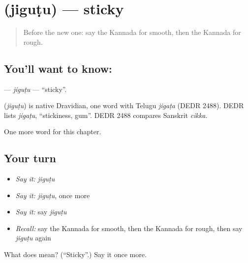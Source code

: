 \section[\texorpdfstring{\kn{ಜಿಗುಟು} (jiguṭu)}{ಜಿಗುಟು (jiguṭu)}]{ (jiguṭu) — sticky}

\label{lesson:KA-C219-jigutu}



\begin{quote}
Before the new one: say the Kannada for smooth, then the Kannada for rough.
\end{quote}

\subsection*{You'll want to know: }
\textbf{} — \emph{jiguṭu} — \textquotedblleft{}sticky\textquotedblright{}.

\begin{cousinweb}
\textbf{} (\emph{jiguṭu}) is native Dravidian, one word with Telugu \emph{jigaṭa} (DEDR 2488). DEDR lists \emph{jigaṭu}, \textquotedblleft{}stickiness, gum\textquotedblright{}. DEDR 2488 compares Sanskrit \emph{cikka}.
\end{cousinweb}

\begin{grammarlens}[title={What you've built}]
One more word for this chapter.
\end{grammarlens}

\subsection*{Your turn}
\begin{itemize}
\raggedright
  \item \emph{Say it:} \emph{jiguṭu}
  \item \emph{Say it:} \emph{jiguṭu}, once more
  \item \emph{Say it:} say \emph{jiguṭu}
  \item \emph{Recall:} say the Kannada for smooth, then the Kannada for rough, then say \emph{jiguṭu} again
\end{itemize}

\begin{tcolorbox}[breakable,colback=teal!4,colframe=teal!35!black,title={Before you move on}]
What does  mean? (\textquotedblleft{}Sticky\textquotedblright{}.) Say it once more.
\end{tcolorbox}
